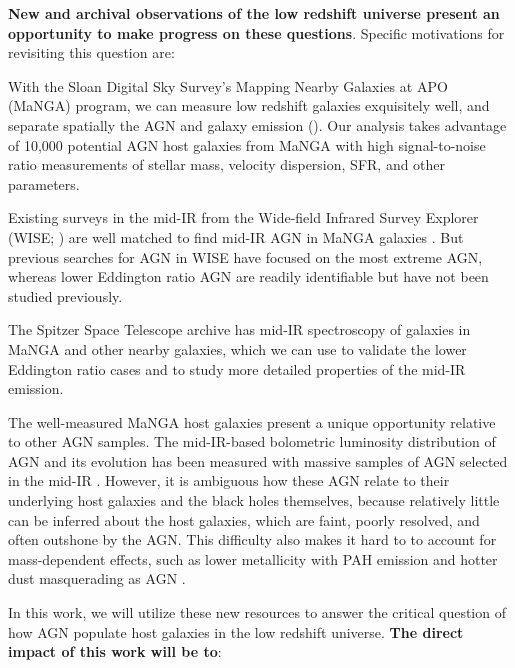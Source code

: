 \documentclass[12pt, preprint]{hacked-aastex}
\newlength{\mylen}
\newenvironment{ditemize}
{ \begin{list}{}{%
\setlength{\topsep}{0pt}%
\setlength{\partopsep}{3pt}%
\setlength{\itemsep}{1pt}\setlength{\parsep}{1pt}%
\setlength{\itemindent}{0pt}\setlength{\listparindent}{12pt}%
\setlength{\leftmargin}{24pt}\setlength{\rightmargin}{0in}%
\setlength{\labelsep}{3pt}\setlength{\labelwidth}{6pt}%
\setlength{\mylen}{3pt}
\renewcommand{\makelabel}{\makebox[\labelwidth][l]{\raisebox{\mylen}{\tiny$\bullet$}\hspace{\fill}}}}}
{\end{list}}
\begin{document}
{\bf New and archival observations of the low redshift universe
  present an opportunity to make progress on these
  questions}. Specific motivations for revisiting this question are:
\begin{ditemize}
\item With the Sloan Digital Sky Survey's Mapping Nearby Galaxies at
  APO (MaNGA) program, we can measure low redshift galaxies
  exquisitely well, and separate spatially the AGN and galaxy emission
  (\cite{bundy15a, blanton17a}).  Our analysis takes advantage of
  10,000 potential AGN host galaxies from MaNGA with high
  signal-to-noise ratio measurements of stellar mass, velocity
  dispersion, SFR, and other parameters.
\item Existing surveys in the mid-IR from the Wide-field Infrared
  Survey Explorer (WISE; \cite{wright10a}) are well matched to find
  mid-IR AGN in MaNGA galaxies \cite{comerford20a}. But previous
  searches for AGN in WISE have focused on the most extreme AGN,
  whereas lower Eddington ratio AGN are readily identifiable but have
  not been studied previously.
\item The Spitzer Space Telescope archive has mid-IR spectroscopy of
  galaxies in MaNGA and other nearby galaxies, which we can use to
  validate the lower Eddington ratio cases and to study more detailed
  properties of the mid-IR emission.
\end{ditemize}

The well-measured MaNGA host galaxies present a unique opportunity
relative to other AGN samples. The mid-IR-based bolometric luminosity
distribution of AGN and its evolution has been measured with massive
samples of AGN selected in the mid-IR \cite{lacy15a}. However, it is
ambiguous how these AGN relate to their underlying host galaxies and
the black holes themselves, because relatively little can be inferred
about the host galaxies, which are faint, poorly resolved, and often
outshone by the AGN.  This difficulty also makes it hard to to account
for mass-dependent effects, such as lower metallicity with PAH
emission and hotter dust masquerading as AGN \cite{hainline16a,
  sajina22a}.

In this work, we will utilize these new resources to answer the
critical question of how AGN populate host galaxies in the low
redshift universe. {\bf The direct impact of this work will be to}:
\end{document}
